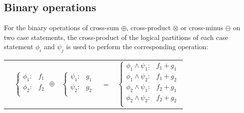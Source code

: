 \documentclass[twoside,11pt]{article}
\begin{document}
\subsection{Binary operations}
\label{BinaryOp}
For the binary operations of cross-sum $\oplus$, cross-product $\otimes$ or cross-minus $\ominus$ on two case statements, the cross-product
of the logical partitions of each case statement  $\phi_i$ and $\psi_j$ is used to perform the
corresponding operation:

{%
\begin{center}
\begin{tabular}{r c c c l}
&
\hspace{-6mm} 
  $\begin{cases}
    \phi_1: & f_1 \\ 
    \phi_2: & f_2 \\ 
  \end{cases}$
$\oplus$
&
\hspace{-4mm}
  $\begin{cases}
    \psi_1: & g_1 \\ 
    \psi_2: & g_2 \\ 
  \end{cases}$
&
\hspace{-2mm} 
$ = $
&
\hspace{-2mm}
  $\begin{cases}
  \phi_1 \wedge \psi_1: & f_1 + g_1 \\ 
  \phi_1 \wedge \psi_2: & f_1 + g_2 \\ 
  \phi_2 \wedge \psi_1: & f_2 + g_1 \\ 
  \phi_2 \wedge \psi_2: & f_2 + g_2 \\ 
  \end{cases}$
\end{tabular}
\vspace{4mm}
\hspace{-2mm}


\end{center}}
\end{document}
